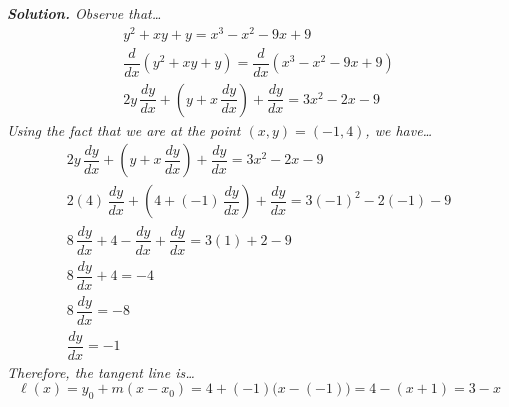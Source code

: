 \documentclass[12pt,letterpaper]{exam}
\begin{document}
\begin{questions}
{\itshape\textbf{Solution.} Observe that\dots
	\[
	\begin{gathered}
	y^2 + xy + y= x^3 - x^2 - 9x + 9 \\[0.1cm]
	\dfrac{d}{dx} \left(y^2 + xy + y \right)= \dfrac{d}{dx} \left( x^3 - x^2 - 9x + 9 \right) \\[0.1cm]
	2y \, \dfrac{dy}{dx} + \left(y + x \, \dfrac{dy}{dx} \right) + \dfrac{dy}{dx}= 3x^2 - 2x - 9
	\end{gathered}
	\]
Using the fact that we are at the point $(x, y)= (-1, 4)$, we have\dots
	\[
	\begin{gathered}
	2y \, \dfrac{dy}{dx} + \left(y + x \, \dfrac{dy}{dx} \right) + \dfrac{dy}{dx}= 3x^2 - 2x - 9 \\[0.1cm]
	2(4) \, \dfrac{dy}{dx} + \left(4 + (-1) \, \dfrac{dy}{dx} \right) + \dfrac{dy}{dx}= 3(-1)^2 - 2(-1) - 9 \\[0.1cm]
	8 \,\dfrac{dy}{dx} + 4 - \dfrac{dy}{dx} + \dfrac{dy}{dx}= 3(1) + 2 - 9 \\[0.1cm]
	8 \,\dfrac{dy}{dx} + 4= -4 \\[0.1cm]
	8\, \dfrac{dy}{dx}= -8 \\[0.1cm]
	\dfrac{dy}{dx}= -1
	\end{gathered}
	\]
Therefore, the tangent line is\dots
	\[
	\ell(x)= y_0 + m (x - x_0)= 4 + (-1) \big(x - (-1) \big)= 4 - (x + 1)= 3 - x
	\]
}

\end{questions}
\end{document}

